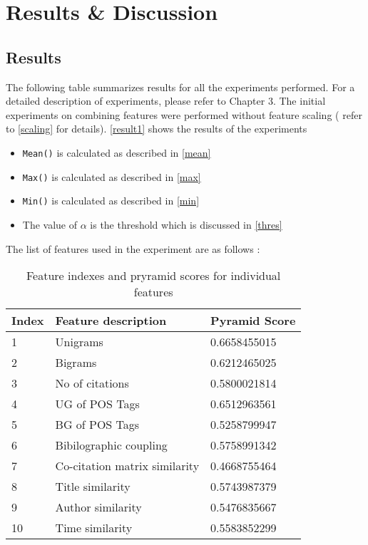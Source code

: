 \chapter{Results \& Discussion}
\section{Results}

The following table summarizes results for all the experiments performed. For a detailed description of experiments, please refer to Chapter 3. The initial experiments on combining features were performed without feature scaling ( refer to \ref{scaling} for details). \ref{result1} shows the results of the experiments

\begin{itemize}
\item \texttt{Mean()} is calculated as described in \ref{mean}
\item \texttt{Max()} is calculated as described in \ref{max}
\item \texttt{Min()} is calculated as described in \ref{min}
\item The value of $ \alpha $ is the threshold which is discussed in \ref{thres}
\end{itemize} 

The list of features used in the experiment are as follows :

\begin{table}[!htbp]
\centering
\begin{tabular}{l|l|l}
\hline
\textbf{Index} & \textbf{Feature description}  & \textbf{Pyramid Score} \\ \hline
1              & Unigrams                      & 0.6658455015           \\ \hline
2              & Bigrams                       & 0.6212465025           \\ \hline
3              & No of citations               & 0.5800021814           \\ \hline
4              & UG of POS Tags                & 0.6512963561           \\ \hline
5              & BG of POS Tags                & 0.5258799947           \\ \hline
6              & Bibilographic coupling        & 0.5758991342           \\ \hline
7              & Co-citation matrix similarity & 0.4668755464           \\ \hline
8              & Title similarity              & 0.5743987379           \\ \hline
9              & Author similarity             & 0.5476835667           \\ \hline
10             & Time similarity               & 0.5583852299           \\ \hline
\end{tabular}
\caption{Feature indexes and pryramid scores for individual features}
\label{my-label}

\end{table}



